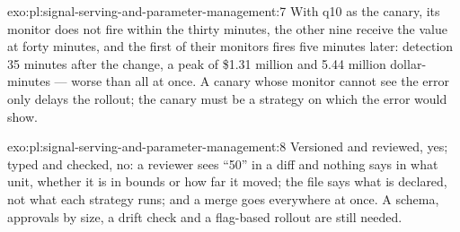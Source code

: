 \begin{solution}{exo:pl:signal-serving-and-parameter-management:7}
With q10 as the canary, its monitor does not fire within the thirty minutes, the other nine receive the value at forty minutes, and the first of
their monitors fires five minutes later: detection 35 minutes after the change, a peak of \$1.31 million and 5.44 million dollar-minutes --- worse
than all at once. A canary whose monitor cannot see the error only delays the rollout; the canary must be a strategy on which the error would
show.
\end{solution}

\begin{solution}{exo:pl:signal-serving-and-parameter-management:8}
Versioned and reviewed, yes; typed and checked, no: a reviewer sees ``50'' in a diff and nothing says in what unit, whether it is in bounds or
how far it moved; the file says what is declared, not what each strategy runs; and a merge goes everywhere at once. A schema, approvals by
size, a drift check and a flag-based rollout are still needed.
\end{solution}

